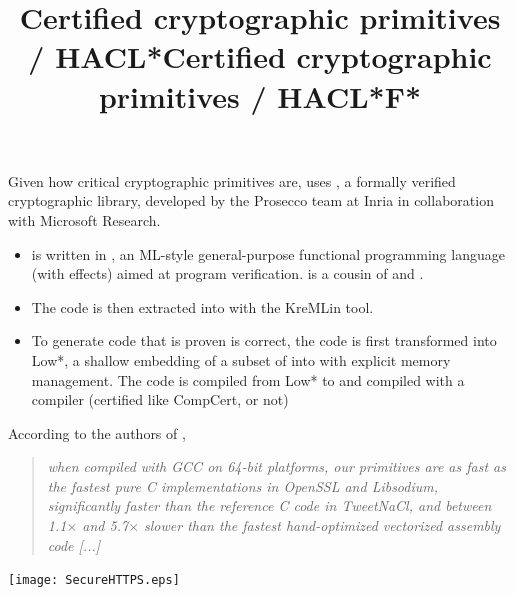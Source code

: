 \documentclass[wide]{slides}
\begin{document}
\begin{slide}
  \title{Certified cryptographic primitives / HACL*}

  Given how critical cryptographic primitives are, \Tezos uses
  \HACLstar, a formally verified cryptographic library, developed by
  the Prosecco team at Inria in collaboration with Microsoft
  Research.

  \begin{itemize}

    \item \HACLstar is written in \Fstar, an \textsf{ML}-style
      general-purpose functional programming language (with effects)
      aimed at program verification. \Fstar is a cousin of \OCaml and
      \Coq.

    \item The \Fstar code is then extracted into \Clang with the
      \textsf{KreMLin} tool.

    \item To generate \Clang code that is proven is correct, the
      \Fstar code is first transformed into \textsf{Low*}, a shallow
      embedding of a subset of \Clang into \Fstar with explicit memory
      management. The code is compiled from \textsf{Low*} to \Clang
      and compiled with a \Clang compiler (certified like CompCert, or
      not)

  \end{itemize}

\end{slide}

\begin{slide}
  \title{Certified cryptographic primitives / HACL*}

  According to the authors of \HACLstar,

  \bigskip

  \begin{quote}
    \textit{when compiled with GCC on 64-bit platforms, our primitives
      are as fast as the fastest pure C implementations in OpenSSL and
      Libsodium, significantly faster than the reference C code in
      TweetNaCl, and between 1.1\(\times\) and 5.7\(\times\) slower
      than the fastest hand-optimized vectorized assembly code [...]}
  \end{quote}

\end{slide}

\begin{slide}
  \title{F*}

  \begin{center}
    \texttt{[image: SecureHTTPS.eps]}
  \end{center}

\end{slide}
\end{document}
